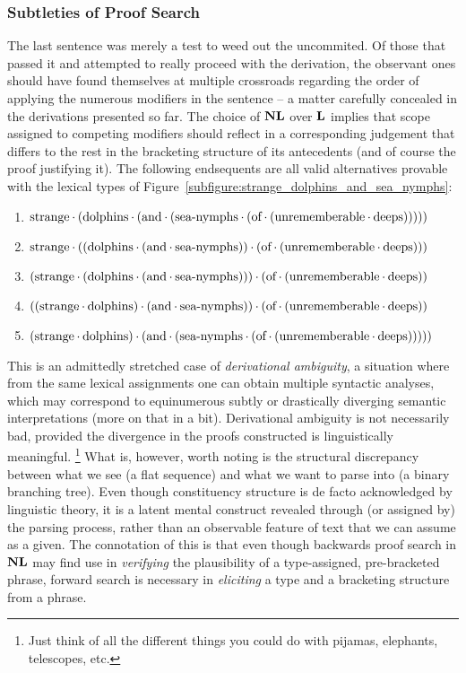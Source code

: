 \subsubsection{Subtleties of Proof Search}
The last sentence was merely a test to weed out the uncommited.
Of those that passed it and attempted to really proceed with the derivation, the observant ones should have found themselves at multiple crossroads regarding the order of applying the numerous modifiers in the sentence -- a matter carefully concealed in the derivations presented so far.
The choice of $\textbf{NL}$ over $\textbf{L}$ implies that scope assigned to competing modifiers should reflect in a corresponding judgement that differs to the rest in the bracketing structure of its antecedents (and of course the proof justifying it).
The following endsequents are all valid alternatives provable with the lexical types of Figure~\ref{subfigure:strange_dolphins_and_sea_nymphs}:

{\smaller
\begin{enumerate}
\item $\text{strange}\mkern-0.5mu\cdot\mkern-0.5mu (\text{dolphins}\mkern-0.5mu\cdot\mkern-0.5mu (\text{and}\mkern-0.5mu\cdot\mkern-0.5mu (\text{sea-nymphs}\mkern-0.5mu\cdot\mkern-0.5mu (\text{of}\mkern-0.5mu\cdot\mkern-0.5mu (\text{unrememberable}\mkern-0.5mu\cdot\mkern-0.5mu \text{deeps})))))$
\item $\text{strange}\mkern-0.5mu\cdot\mkern-0.5mu ((\text{dolphins}\mkern-0.5mu\cdot\mkern-0.5mu (\text{and}\mkern-0.5mu\cdot\mkern-0.5mu \text{sea-nymphs}))\mkern-0.5mu\cdot\mkern-0.5mu (\text{of}\mkern-0.5mu\cdot\mkern-0.5mu (\text{unrememberable}\mkern-0.5mu\cdot\mkern-0.5mu \text{deeps})))$
\item $(\text{strange}\mkern-0.5mu\cdot\mkern-0.5mu (\text{dolphins}\mkern-0.5mu\cdot\mkern-0.5mu (\text{and}\mkern-0.5mu\cdot\mkern-0.5mu \text{sea-nymphs})))\mkern-0.5mu\cdot\mkern-0.5mu (\text{of}\mkern-0.5mu\cdot\mkern-0.5mu (\text{unrememberable}\mkern-0.5mu\cdot\mkern-0.5mu \text{deeps}))$
\item $((\text{strange}\mkern-0.5mu\cdot\mkern-0.5mu \text{dolphins})\mkern-0.5mu\cdot\mkern-0.5mu (\text{and}\mkern-0.5mu\cdot\mkern-0.5mu \text{sea-nymphs}))\mkern-0.5mu\cdot\mkern-0.5mu (\text{of}\mkern-0.5mu\cdot\mkern-0.5mu (\text{unrememberable}\mkern-0.5mu\cdot\mkern-0.5mu \text{deeps}))$
\item $(\text{strange}\mkern-0.5mu\cdot\mkern-0.5mu \text{dolphins})\mkern-0.5mu\cdot\mkern-0.5mu (\text{and}\mkern-0.5mu\cdot\mkern-0.5mu (\text{sea-nymphs}\mkern-0.5mu\cdot\mkern-0.5mu (\text{of}\mkern-0.5mu\cdot\mkern-0.5mu (\text{unrememberable}\mkern-0.5mu\cdot\mkern-0.5mu \text{deeps})))))$
\end{enumerate}
}
This is an admittedly stretched case of \textit{derivational ambiguity}, a situation where from the same lexical assignments one can obtain multiple syntactic analyses, which may correspond to equinumerous subtly or drastically diverging semantic interpretations (more on that in a bit).
Derivational ambiguity is not necessarily bad, provided the divergence in the proofs constructed is linguistically meaningful.%
\footnote{Just think of all the different things you could do with pijamas, elephants, telescopes, etc.}
What is, however, worth noting is the structural discrepancy between what we see (a flat sequence) and what we want to parse into (a binary branching tree).
Even though constituency structure is de facto acknowledged by linguistic theory, it is a latent mental construct revealed through (or assigned by) the parsing process, rather than an observable feature of text that we can assume as a given.
The connotation of this is that even though backwards proof search in $\textbf{NL}$ may find use in \textit{verifying} the plausibility of a type-assigned, pre-bracketed phrase, forward search is necessary in \textit{eliciting} a type and a bracketing structure from a phrase. 

